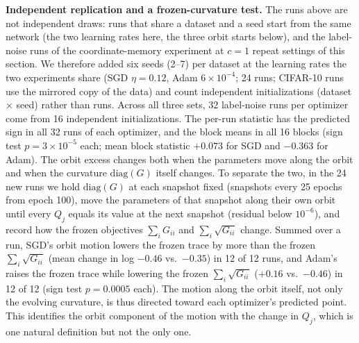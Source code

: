 \documentclass[10pt]{article}
\theoremstyle{remark}
\begin{document}
\textbf{Independent replication and a frozen-curvature test.} The runs above are not independent draws: runs that share a dataset and a seed start from the same network (the two learning rates here, the three orbit starts below), and the label-noise runs of the coordinate-memory experiment at $c=1$ repeat settings of this section. We therefore added six seeds (2--7) per dataset at the learning rates the two experiments share (SGD $\eta=0.12$, Adam $6\times10^{-4}$; 24 runs; CIFAR-10 runs use the mirrored copy of the data) and count independent initializations (dataset $\times$ seed) rather than runs. Across all three sets, 32 label-noise runs per optimizer come from 16 independent initializations. The per-run statistic has the predicted sign in all 32 runs of each optimizer, and the block means in all 16 blocks (sign test $p=3\times10^{-5}$ each; mean block statistic $+0.073$ for SGD and $-0.363$ for Adam). The orbit excess changes both when the parameters move along the orbit and when the curvature $\mathrm{diag}(G)$ itself changes. To separate the two, in the 24 new runs we hold $\mathrm{diag}(G)$ at each snapshot fixed (snapshots every 25 epochs from epoch 100), move the parameters of that snapshot along their own orbit until every $Q_j$ equals its value at the next snapshot (residual below $10^{-6}$), and record how the frozen objectives $\sum_iG_{ii}$ and $\sum_i\sqrt{G_{ii}}$ change. Summed over a run, SGD's orbit motion lowers the frozen trace by more than the frozen $\sum_i\sqrt{G_{ii}}$ (mean change in log $-0.46$ vs.\ $-0.35$) in 12 of 12 runs, and Adam's raises the frozen trace while lowering the frozen $\sum_i\sqrt{G_{ii}}$ ($+0.16$ vs.\ $-0.46$) in 12 of 12 (sign test $p=0.0005$ each). The motion along the orbit itself, not only the evolving curvature, is thus directed toward each optimizer's predicted point. This identifies the orbit component of the motion with the change in $Q_j$, which is one natural definition but not the only one.
\end{document}
